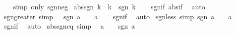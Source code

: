 \begin{isabellebody}
%
\isadelimproof
\ \ %
\endisadelimproof
%
\isatagproof
{}\isamarkupfalse%
\ {\isacharparenleft}{\kern0pt}simp\ only{\isacharcolon}{\kern0pt}\ sgn{\isacharunderscore}{\kern0pt}{}{\isacharunderscore}{\kern0pt}neg{\isacharparenright}{\kern0pt}%
\endisatagproof
{\isafoldproof}%
%
\isadelimproof
\isanewline
%
\endisadelimproof
\isanewline
{}\isamarkupfalse%
\ abs{\isacharunderscore}{\kern0pt}sgn{\isacharcolon}{\kern0pt}\ {\isachardoublequoteopen}{\isasymbar}k{\isasymbar}\ {\isacharequal}{\kern0pt}\ k\ {\isacharasterisk}{\kern0pt}\ sgn\ k{\isachardoublequoteclose}\isanewline
%
\isadelimproof
\ \ %
\endisadelimproof
%
\isatagproof
{}\isamarkupfalse%
\ sgn{\isacharunderscore}{\kern0pt}if\ abs{\isacharunderscore}{\kern0pt}if\ \isamarkupfalse%
\ auto%
\endisatagproof
{\isafoldproof}%
%
\isadelimproof
\isanewline
%
\endisadelimproof
\isanewline
{}\isamarkupfalse%
\ sgn{\isacharunderscore}{\kern0pt}greater\ {\isacharbrackleft}{\kern0pt}simp{\isacharbrackright}{\kern0pt}{\isacharcolon}{\kern0pt}\ {\isachardoublequoteopen}{}\ {\isacharless}{\kern0pt}\ sgn\ a\ {\isasymlongleftrightarrow}\ {}\ {\isacharless}{\kern0pt}\ a{\isachardoublequoteclose}\isanewline
%
\isadelimproof
\ \ %
\endisadelimproof
%
\isatagproof
{}\isamarkupfalse%
\ sgn{\isacharunderscore}{\kern0pt}if\ \isamarkupfalse%
\ auto%
\endisatagproof
{\isafoldproof}%
%
\isadelimproof
\isanewline
%
\endisadelimproof
\isanewline
{}\isamarkupfalse%
\ sgn{\isacharunderscore}{\kern0pt}less\ {\isacharbrackleft}{\kern0pt}simp{\isacharbrackright}{\kern0pt}{\isacharcolon}{\kern0pt}\ {\isachardoublequoteopen}sgn\ a\ {\isacharless}{\kern0pt}\ {}\ {\isasymlongleftrightarrow}\ a\ {\isacharless}{\kern0pt}\ {}{\isachardoublequoteclose}\isanewline
%
\isadelimproof
\ \ %
\endisadelimproof
%
\isatagproof
{}\isamarkupfalse%
\ sgn{\isacharunderscore}{\kern0pt}if\ \isamarkupfalse%
\ auto%
\endisatagproof
{\isafoldproof}%
%
\isadelimproof
\isanewline
%
\endisadelimproof
\isanewline
{}\isamarkupfalse%
\ abs{\isacharunderscore}{\kern0pt}sgn{\isacharunderscore}{\kern0pt}eq{\isacharunderscore}{\kern0pt}{}\ {\isacharbrackleft}{\kern0pt}simp{\isacharbrackright}{\kern0pt}{\isacharcolon}{\kern0pt}\isanewline
\ \ {\isachardoublequoteopen}a\ {\isasymnoteq}\ {}\ {\isasymLongrightarrow}\ {\isasymbar}sgn\ a{\isasymbar}\ {\isacharequal}{\kern0pt}\ {}{\isachardoublequoteclose}\isanewline

\end{isabellebody}

